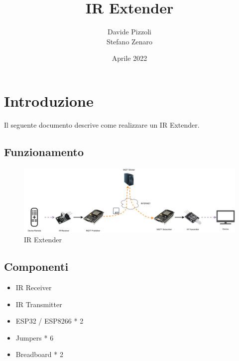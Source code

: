 \documentclass[a4paper,11pt]{article}
\begin{document}
\title{IR Extender}
\author{Davide Pizzoli \\ Stefano Zenaro}
\date{Aprile 2022}


\begin{titlepage}
  \maketitle
  \thispagestyle{empty}
\end{titlepage}

\tableofcontents
{}
\clearpage


\section{Introduzione}

  Il seguente documento descrive come realizzare un IR Extender.

  \subsection{Funzionamento}

    \begin{figure}[H]
      \centering
      \includegraphics[width=\textwidth,height=\textheight,keepaspectratio]{assets/ir_extender}
      \caption{IR Extender}
    \end{figure}


  \subsection{Componenti}

    \begin{itemize}
      \item IR Receiver
      \item IR Transmitter
      \item ESP32 / ESP8266 * 2
      \item Jumpers * 6
      \item Breadboard * 2
    \end{itemize}
\end{document}
